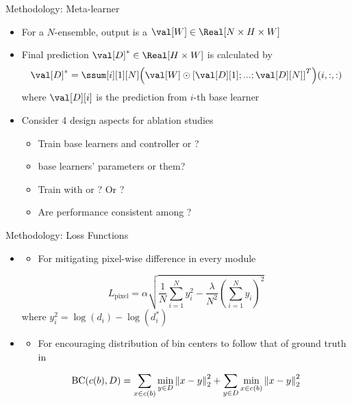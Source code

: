 \documentclass{cubeamer}
\begin{document}
\begin{frame}{Methodology: Meta-learner}
\begin{itemize}
    \item For a $N$-ensemble, output is a  $\val[W] \in \Real[N \times H \times W]$
    \item Final prediction $\val[D]^* \in \Real[H \times W]$ is calculated by
    $$
    \val[D]^* = \ssum[i][1][N] \parens*{\val[W] \odot \bracket*{\val[D][1];...;\val[D][N]}^T}(i,:,:)
    $$
    where $\val[D][i]$ is the prediction from $i$-th base learner
    \item Consider 4 design aspects for ablation studies
    \begin{itemize}
        \item Train base learners and controller  or ?
        \item {} base learners' parameters or  them?
        \item Train with  or ? Or ?
        \item Are performance consistent among ?
    \end{itemize}
\end{itemize}

\end{frame}


\begin{frame}{Methodology: Loss Functions}
    \begin{itemize}
        \item {} \cite{eigen2014}
        \begin{itemize}
            \item For mitigating pixel-wise difference in every module
        \end{itemize}
        $$L_{\text{pixel}}=\alpha\sqrt{\frac{1}{N}\sum_{i=1}^{N}y_i^2-\frac{\lambda}{N^2}(\sum_{i=1}^{N}y_i)^2}$$
            where $y_i^{2}=\log(d_i)-\log(d_i^{*})$
        \item {} \cite{adabins}
        \begin{itemize}
            \item For encouraging distribution of bin centers to follow that of ground truth in  \cite{adabins}
        \end{itemize}
        $$\text{BC}(c(b),D) = \sum_{x \in c(b)} \min_{y \in D} \norm{x-y}_2^2 + \sum_{y \in D} \min_{x \in c(b)} \norm{x-y}_2^2 $$
    \end{itemize}
\end{frame}
\end{document}
